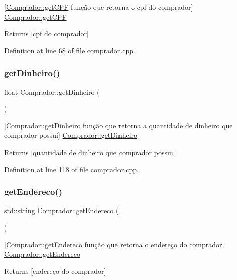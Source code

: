 \mbox{[}\hyperlink{class_comprador_aeb955f1d7fb934cc4e5ffe85d1f5b1f1}{Comprador\+::get\+C\+PF} função que retorna o cpf do comprador\mbox{]}  \hyperlink{class_comprador_aeb955f1d7fb934cc4e5ffe85d1f5b1f1}{Comprador\+::get\+C\+PF} \begin{DoxyReturn}{Returns}
\mbox{[}cpf do comprador\mbox{]} 
\end{DoxyReturn}


Definition at line 68 of file comprador.\+cpp.

\mbox{\label{class_comprador_a92c4ce72febc0bdddc9a709f26656729}} 
\subsubsection{\texorpdfstring{get\+Dinheiro()}{getDinheiro()}}
{\footnotesize\ttfamily float Comprador\+::get\+Dinheiro (\begin{DoxyParamCaption}{ }\end{DoxyParamCaption})}

\mbox{[}\hyperlink{class_comprador_a92c4ce72febc0bdddc9a709f26656729}{Comprador\+::get\+Dinheiro} função que retorna a quantidade de dinheiro que comprador possui\mbox{]}  \hyperlink{class_comprador_a92c4ce72febc0bdddc9a709f26656729}{Comprador\+::get\+Dinheiro} \begin{DoxyReturn}{Returns}
\mbox{[}quantidade de dinheiro que comprador possui\mbox{]} 
\end{DoxyReturn}


Definition at line 118 of file comprador.\+cpp.

\mbox{\label{class_comprador_a590eb62bff00484b051e13261d050e83}} 
\subsubsection{\texorpdfstring{get\+Endereco()}{getEndereco()}}
{\footnotesize\ttfamily std\+::string Comprador\+::get\+Endereco (\begin{DoxyParamCaption}{ }\end{DoxyParamCaption})}

\mbox{[}\hyperlink{class_comprador_a590eb62bff00484b051e13261d050e83}{Comprador\+::get\+Endereco} função que retorna o endereço do comprador\mbox{]}  \hyperlink{class_comprador_a590eb62bff00484b051e13261d050e83}{Comprador\+::get\+Endereco} \begin{DoxyReturn}{Returns}
\mbox{[}endereço do comprador\mbox{]} 
\end{DoxyReturn}


